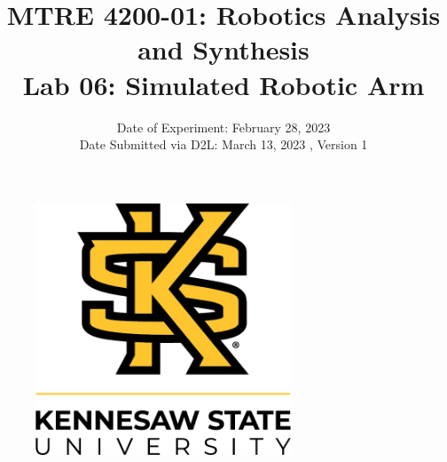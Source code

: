 \documentclass{article} %
\begin{document}
\begin{titlepage}

	\begin{figure}
	\centering
	\includegraphics[width=3in]{images/ksulogo2.png}  %
	\end{figure}

	\title{MTRE 4200-01: Robotics Analysis and Synthesis\\ Lab 06: Simulated Robotic Arm} %
	\date{Date of Experiment: February 28, 2023 \\ [2mm] Date Submitted via D2L: March 13, 2023 , Version 1}
	\author{}  %
	\maketitle
	\thispagestyle{empty} %

\end{titlepage}

%
%




\end{document}
